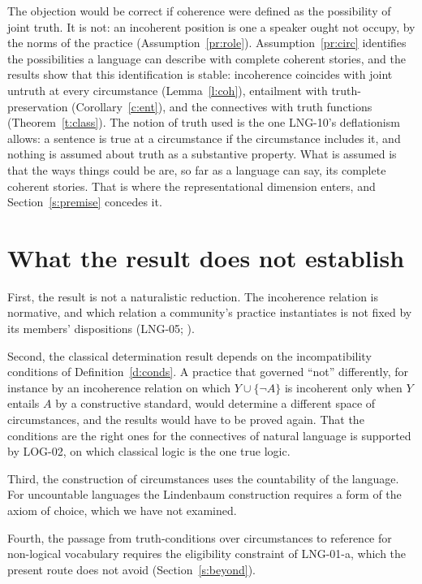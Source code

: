 \documentclass{situationist-preprint}
\begin{document}
\begin{reply}
The objection would be correct if coherence were defined as the possibility of joint truth. It is not: an incoherent position is one a speaker ought not occupy, by the norms of the practice (Assumption~\ref{pr:role}). Assumption~\ref{pr:circ} identifies the possibilities a language can describe with complete coherent stories, and the results show that this identification is stable: incoherence coincides with joint untruth at every circumstance (Lemma~\ref{l:coh}), entailment with truth-preservation (Corollary~\ref{c:ent}), and the connectives with truth functions (Theorem~\ref{t:class}). The notion of truth used is the one LNG-10's deflationism allows: a sentence is true at a circumstance if the circumstance includes it, and nothing is assumed about truth as a substantive property. What is assumed is that the ways things could be are, so far as a language can say, its complete coherent stories. That is where the representational dimension enters, and Section~\ref{s:premise} concedes it.
\end{reply}

\section{What the result does not establish}\label{s:not}

First, the result is not a naturalistic reduction. The incoherence relation is normative, and which relation a community's practice instantiates is not fixed by its members' dispositions (LNG-05; \citealt{Kripke1982}).

Second, the classical determination result depends on the incompatibility conditions of Definition~\ref{d:conds}. A practice that governed \enquote{not} differently, for instance by an incoherence relation on which $Y \cup \{\neg A\}$ is incoherent only when $Y$ entails $A$ by a constructive standard, would determine a different space of circumstances, and the results would have to be proved again. That the conditions are the right ones for the connectives of natural language is supported by LOG-02, on which classical logic is the one true logic.

Third, the construction of circumstances uses the countability of the language. For uncountable languages the Lindenbaum construction requires a form of the axiom of choice, which we have not examined.

Fourth, the passage from truth-conditions over circumstances to reference for non-logical vocabulary requires the eligibility constraint of LNG-01-a, which the present route does not avoid (Section~\ref{s:beyond}).
\end{document}
